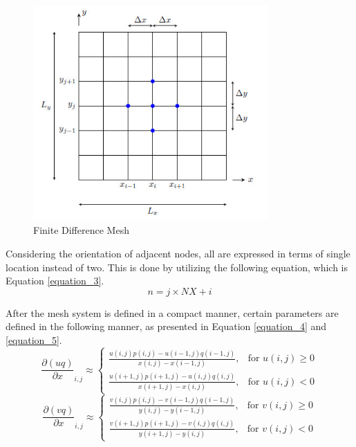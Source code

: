 \documentclass{article}
\begin{document}
\begin{figure}[hbt!]
    \centering
    \includegraphics[width=0.8\textwidth]{Figures/finite_difference_picture.jpg}
    \caption{Finite Difference Mesh}
    \label{figure_1}
\end{figure}

Considering the orientation of adjacent nodes, all are expressed in terms of single location instead of two. This is done by utilizing the following equation, which is Equation \ref{equation_3}. 
\begin{equation} %
    n = j \times NX +i  
    \label{equation_3}
\end{equation}

After the mesh system is defined in a compact manner, certain parameters are defined in the following manner, as presented in Equation \ref{equation_4} and  \ref{equation_5}. 
\begin{equation} %
    \frac{\partial (uq)}{\partial x}_{i,j} \approx
\begin{cases}
    \frac{u(i, j)p(i, j) - u(i-1, j)q(i-1, j)}{x(i, j) - x(i-1, j)}, & \text{for } u(i, j) \geq 0 \\
    \frac{u(i+1, j)p(i+1, j) - u(i, j)q(i, j)}{x(i+1, j) - x(i, j)}, & \text{for } u(i, j) < 0
\end{cases}  
    \label{equation_4}
\end{equation}
\begin{equation}
\frac{\partial (vq)}{\partial x}_{i,j} \approx
\begin{cases}
    \frac{v(i, j)p(i, j) - v(i-1, j)q(i-1, j)}{y(i, j) - y(i-1, j)}, & \text{for } v(i, j) \geq 0 \\
    \frac{v(i+1, j)p(i+1, j) - v(i, j)q(i, j)}{y(i+1, j) - y(i, j)}, & \text{for } v(i, j) < 0
\end{cases}
\label{equation_5}
\end{equation}
\end{document}
